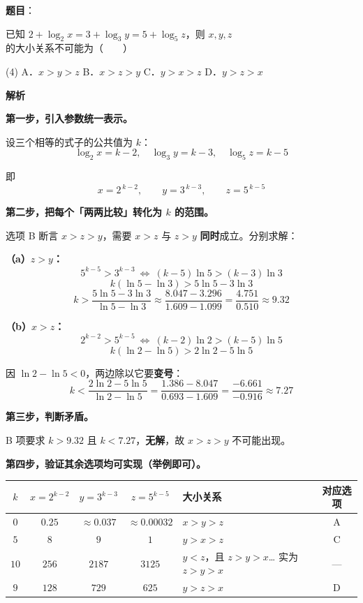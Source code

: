 \begin{answer}

\textbf{题目}：

已知 $2+\log_2 x=3+\log_3 y=5+\log_5 z$，则 $x,y,z$ 的大小关系不可能为\mbox{（　　）}

\begin{gkopts}(4)
\task A．$x>y>z$
\task B．$x>z>y$
\task C．$y>x>z$
\task D．$y>z>x$
\end{gkopts}

\textbf{解析}

\textbf{第一步，引入参数统一表示。}

设三个相等的式子的公共值为 $k$：
\nopagebreak[4]
\[\log_2x=k-2,\quad \log_3y=k-3,\quad \log_5z=k-5\]

即
\nopagebreak[4]
\[x=2^{\,k-2},\qquad y=3^{\,k-3},\qquad z=5^{\,k-5}\]

\textbf{第二步，把每个「两两比较」转化为 $k$ 的范围。}

选项 B 断言 $x>z>y$，需要 $x>z$ 与 $z>y$ \textbf{同时}成立。分别求解：

\textbf{（a）$z>y$：}
\nopagebreak[4]
\[5^{k-5}>3^{k-3}\ \Longleftrightarrow\ (k-5)\ln5>(k-3)\ln3\]
\nopagebreak[4]
\[k(\ln5-\ln3)>5\ln5-3\ln3\]
\nopagebreak[4]
\[k>\frac{5\ln5-3\ln3}{\ln5-\ln3}\approx\frac{8.047-3.296}{1.609-1.099}=\frac{4.751}{0.510}\approx9.32\]

\textbf{（b）$x>z$：}
\nopagebreak[4]
\[2^{k-2}>5^{k-5}\ \Longleftrightarrow\ (k-2)\ln2>(k-5)\ln5\]
\nopagebreak[4]
\[k(\ln2-\ln5)>2\ln2-5\ln5\]

因 $\ln2-\ln5<0$，两边除以它要\textbf{变号}：
\nopagebreak[4]
\[k<\frac{2\ln2-5\ln5}{\ln2-\ln5}=\frac{1.386-8.047}{0.693-1.609}=\frac{-6.661}{-0.916}\approx7.27\]

\textbf{第三步，判断矛盾。}

B 项要求 $k>9.32$ 且 $k<7.27$，\textbf{无解}，故 $x>z>y$ 不可能出现。

\textbf{第四步，验证其余选项均可实现（举例即可）。}

\begin{center}
\begin{tabular}{cccclc}
\toprule
$k$ & $x=2^{k-2}$ & $y=3^{k-3}$ & $z=5^{k-5}$ & 大小关系 & 对应选项 \\
\midrule
$0$ & $0.25$ & $\approx0.037$ & $\approx0.00032$ & $x>y>z$ & A  \\
$5$ & $8$ & $9$ & $1$ & $y>x>z$ & C  \\
$10$ & $256$ & $2187$ & $3125$ & $y<z$，且 $z>y>x$… 实为 $z>y>x$ & — \\
$9$ & $128$ & $729$ & $625$ & $y>z>x$ & D  \\
\bottomrule
\end{tabular}
\end{center}


\end{answer}

